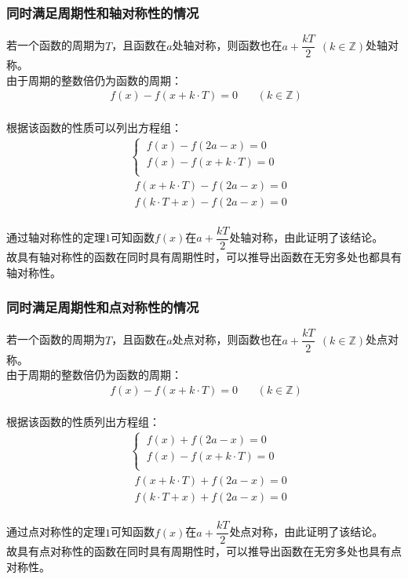 \documentclass[UTF8]{ctexart}
\begin{document}
\newpage

\subsubsection{同时满足周期性和轴对称性的情况}
    \setcounter{equation}{0}
    若一个函数的周期为$T$，且函数在$a$处轴对称，则函数也在$a+\dfrac{kT}{2}~~(k\in\mathbb{Z})$处轴对称。\\[3mm]
    由于周期的整数倍仍为函数的周期：
    \begin{align}
        ~~f(x)-f(x+k\cdot T)=0~~~~~~~~(k\in \mathbb{Z})
    \end{align}\\
    根据该函数的性质可以列出方程组：
    \begin{align}
        &\begin{cases}
            ~f(x)-f(2a-x)=0\\[1mm]
            ~f(x)-f(x+k\cdot T)=0\\[1mm]
        \end{cases}\\[3mm]
        &~~f(x+k\cdot T)-f(2a-x)=0\\[3mm]
        &~~f(k\cdot T+x)-f(2a-x)=0
    \end{align}\\
    通过轴对称性的定理$1$可知函数$f(x)$在$a+\dfrac{kT}{2}$处轴对称，由此证明了该结论。\\[3mm]
    故具有轴对称性的函数在同时具有周期性时，可以推导出函数在无穷多处也都具有轴对称性。\vspace{8pt}

\subsubsection{同时满足周期性和点对称性的情况}
    \setcounter{equation}{0}
    若一个函数的周期为$T$，且函数在$a$处点对称，则函数也在$a+\dfrac{kT}{2}~~(k\in\mathbb{Z})$处点对称。\\[3mm]
    由于周期的整数倍仍为函数的周期：
    \begin{align}
        ~~f(x)-f(x+k\cdot T)=0~~~~~~~~(k\in \mathbb{Z})
    \end{align}\\
    根据该函数的性质列出方程组：
    \begin{align}
        &\begin{cases}
            ~f(x)+f(2a-x)=0\\[1mm]
            ~f(x)-f(x+k\cdot T)=0\\[1mm]
        \end{cases}\\[3mm]
        &~~f(x+k\cdot T)+f(2a-x)=0\\[3mm]
        &~~f(k\cdot T+x)+f(2a-x)=0
    \end{align}\\
    通过点对称性的定理$1$可知函数$f(x)$在$a+\dfrac{kT}{2}$处点对称，由此证明了该结论。\\[3mm]
    故具有点对称性的函数在同时具有周期性时，可以推导出函数在无穷多处也具有点对称性。
\end{document}

